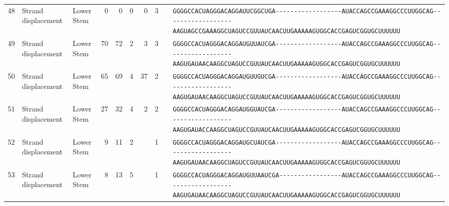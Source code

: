 \begin{tabular}{rllrrrrrcl}
 48 & Strand displacement & Lower Stem & 0 & 0 & 0 & 0 & 3 &  &
 \color{ucsfblack}\verb|GGGGCCACUAGGGACAGGAU|\color{ucsfblue}\verb|UCGGCUGA------------------|\color{ucsfpurple}\verb|AUACCAGCCGAAAGGCCCUUGGCAG|\color{ucsfblue}\verb|------------------AAGUAGCCGA|\color{ucsfnavy}\verb|AAGGCUAGUCCGU|\color{ucsfteal}\verb|UAUCAACUUGAAAAAGUGGCACCGAGUCGGUGC|\color{ucsfblack}\verb|UUUUUU| \\

 49 & Strand displacement & Lower Stem & 70 & 72 & 2 & 3 & 3 &  &
 \color{ucsfblack}\verb|GGGGCCACUAGGGACAGGAU|\color{ucsfblue}\verb|GUUAUCGA------------------|\color{ucsfpurple}\verb|AUACCAGCCGAAAGGCCCUUGGCAG|\color{ucsfblue}\verb|------------------AAGUGAUAAC|\color{ucsfnavy}\verb|AAGGCUAGUCCGU|\color{ucsfteal}\verb|UAUCAACUUGAAAAAGUGGCACCGAGUCGGUGC|\color{ucsfblack}\verb|UUUUUU| \\

 50 & Strand displacement & Lower Stem & 65 & 69 & 4 & 37 & 2 &  &
 \color{ucsfblack}\verb|GGGGCCACUAGGGACAGGAU|\color{ucsfblue}\verb|GUUGUCGA------------------|\color{ucsfpurple}\verb|AUACCAGCCGAAAGGCCCUUGGCAG|\color{ucsfblue}\verb|------------------AAGUGAUAAC|\color{ucsfnavy}\verb|AAGGCUAGUCCGU|\color{ucsfteal}\verb|UAUCAACUUGAAAAAGUGGCACCGAGUCGGUGC|\color{ucsfblack}\verb|UUUUUU| \\

 51 & Strand displacement & Lower Stem & 27 & 32 & 4 & 2 & 2 &  &
 \color{ucsfblack}\verb|GGGGCCACUAGGGACAGGAU|\color{ucsfblue}\verb|GGUAUCGA------------------|\color{ucsfpurple}\verb|AUACCAGCCGAAAGGCCCUUGGCAG|\color{ucsfblue}\verb|------------------AAGUGAUACC|\color{ucsfnavy}\verb|AAGGCUAGUCCGU|\color{ucsfteal}\verb|UAUCAACUUGAAAAAGUGGCACCGAGUCGGUGC|\color{ucsfblack}\verb|UUUUUU| \\

 52 & Strand displacement & Lower Stem & 9 & 11 & 2 &  & 1 &  &
 \color{ucsfblack}\verb|GGGGCCACUAGGGACAGGAU|\color{ucsfblue}\verb|GCUAUCGA------------------|\color{ucsfpurple}\verb|AUACCAGCCGAAAGGCCCUUGGCAG|\color{ucsfblue}\verb|------------------AAGUGAUAAC|\color{ucsfnavy}\verb|AAGGCUAGUCCGU|\color{ucsfteal}\verb|UAUCAACUUGAAAAAGUGGCACCGAGUCGGUGC|\color{ucsfblack}\verb|UUUUUU| \\

 53 & Strand displacement & Lower Stem & 8 & 13 & 5 &  & 1 &  &
 \color{ucsfblack}\verb|GGGGCCACUAGGGACAGGAU|\color{ucsfblue}\verb|GUUAAUCGA-----------------|\color{ucsfpurple}\verb|AUACCAGCCGAAAGGCCCUUGGCAG|\color{ucsfblue}\verb|------------------AAGUGAUAAC|\color{ucsfnavy}\verb|AAGGCUAGUCCGU|\color{ucsfteal}\verb|UAUCAACUUGAAAAAGUGGCACCGAGUCGGUGC|\color{ucsfblack}\verb|UUUUUU| \\


\end{tabular}
